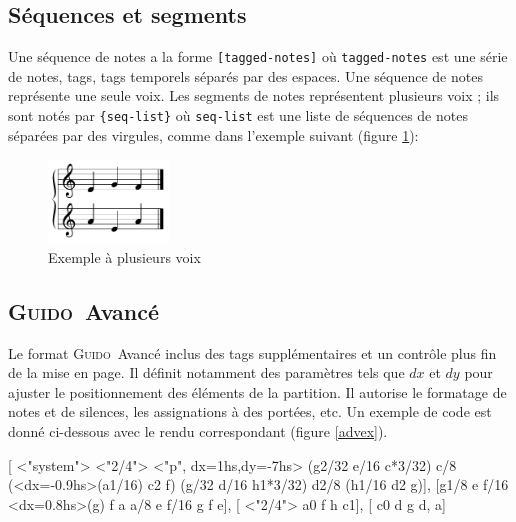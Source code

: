 \documentclass{article}
\newenvironment{gmncode}		{\vspace{-2mm}\small\verbatim}{\endverbatim\vspace{-2mm}}
\newcommand{\Guido}		{\textsc{Guido}}
\newcommand{\code}[1]		{{\small \texttt{#1}}}
\newcommand{\codeindent}	{\\ \hspace*{9mm}}
\begin{document}
\subsection{Séquences et segments}
Une séquence de notes a la forme \verb+[tagged-notes]+ où \code{tagged-notes} est une série de notes, tags, tags temporels séparés par des espaces. Une séquence de notes représente une seule voix.
Les segments de notes représentent plusieurs voix ; ils sont notés par \verb+{seq-list}+ où \code{seq-list} est une liste de séquences de notes séparées par des virgules, comme dans l'exemple suivant (figure \ref{fig:voices}):
\codeindent\code{ \{ [ e g f ], [ a e a ] \} }
\begin{figure}[h]
	\centering \includegraphics[width=32mm]{rsrc/voices}
 \caption{Exemple à plusieurs voix}
 \label{fig:voices}
\end{figure}


\subsection{\Guido\ Avancé}
Le format \Guido\ Avancé inclus des tags supplémentaires et un contrôle plus fin de la mise en page.
Il définit notamment des paramètres tels que $dx$ et $dy$ pour ajuster le positionnement des éléments de la partition. Il autorise le formatage de notes et de silences, les assignations à des portées, etc.
Un exemple de code est donné ci-dessous avec le rendu correspondant (figure \ref{advex}).

\begin{gmncode} 
{
 [
  \barFormat<"system">
   \stemsUp \meter<"2/4"> 
  \intens<"p", dx=1hs,dy=-7hs>
  \beam(g2/32 e/16 c*3/32) c/8 
  \beam(\noteFormat<dx=-0.9hs>(a1/16) c2 f) 
  \beam(g/32 d/16 h1*3/32) d2/8 
  \beam(h1/16 d2 g)],
 [\stemsDown g1/8 e
  f/16 \noteFormat<dx=0.8hs>(g) f a a/8 e 
  f/16 g f e],
 [ \meter<"2/4"> 
  \stemsUp a0 f h c1],
 [ \stemsDown c0 d g {d, a}]
}
\end{gmncode} 
\end{document}
